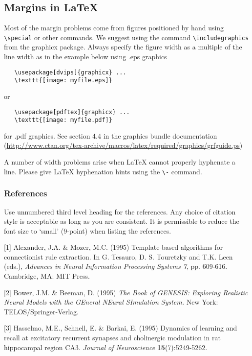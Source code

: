 \documentclass{article} %
\begin{document}
\subsection{Margins in LaTeX}

Most of the margin problems come from figures positioned by hand using
\verb+\special+ or other commands. We suggest using the command
\verb+\includegraphics+
from the graphicx package. Always specify the figure width as a multiple of
the line width as in the example below using .eps graphics
\begin{verbatim}
   \usepackage[dvips]{graphicx} ...
   \texttt{[image: myfile.eps]}
\end{verbatim}
or %
\begin{verbatim}
   \usepackage[pdftex]{graphicx} ...
   \texttt{[image: myfile.pdf]}
\end{verbatim}
for .pdf graphics.
See section 4.4 in the graphics bundle documentation (\url{http://www.ctan.org/tex-archive/macros/latex/required/graphics/grfguide.ps})

A number of width problems arise when LaTeX cannot properly hyphenate a
line. Please give LaTeX hyphenation hints using the \verb+\-+ command.



\subsubsection*{References}
Use unnumbered third level heading for
the references. Any choice of citation style is acceptable as long as you are
consistent. It is permissible to reduce the font size to `small' (9-point)
when listing the references.

\small{
[1] Alexander, J.A. \& Mozer, M.C. (1995) Template-based algorithms
for connectionist rule extraction. In G. Tesauro, D. S. Touretzky
and T.K. Leen (eds.), {\it Advances in Neural Information Processing
Systems 7}, pp. 609-616. Cambridge, MA: MIT Press.

[2] Bower, J.M. \& Beeman, D. (1995) {\it The Book of GENESIS: Exploring
Realistic Neural Models with the GEneral NEural SImulation System.}
New York: TELOS/Springer-Verlag.

[3] Hasselmo, M.E., Schnell, E. \& Barkai, E. (1995) Dynamics of learning
and recall at excitatory recurrent synapses and cholinergic modulation
in rat hippocampal region CA3. {\it Journal of Neuroscience}
{\bf 15}(7):5249-5262.
}
\end{document}

